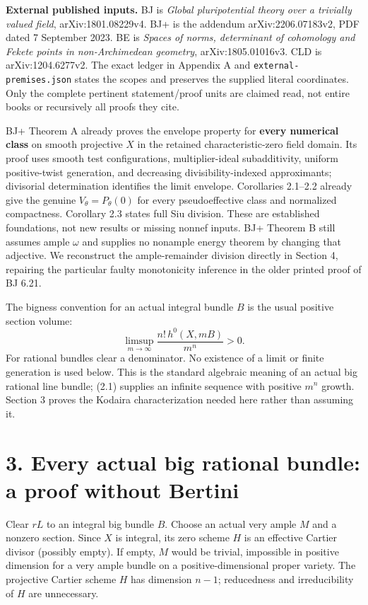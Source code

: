 \documentclass[
  10pt,
]{article}
\begin{document}
\textbf{External published inputs.} BJ is \emph{Global pluripotential
theory over a trivially valued field}, arXiv:1801.08229v4. BJ+ is the
addendum arXiv:2206.07183v2, PDF dated 7 September 2023. BE is
\emph{Spaces of norms, determinant of cohomology and Fekete points in
non-Archimedean geometry}, arXiv:1805.01016v3. CLD is arXiv:1204.6277v2.
The exact ledger in Appendix A and \texttt{external-premises.json}
states the scopes and preserves the supplied literal coordinates. Only
the complete pertinent statement/proof units are claimed read, not
entire books or recursively all proofs they cite.

BJ+ Theorem A already proves the envelope property for \textbf{every
numerical class} on smooth projective \(X\) in the retained
characteristic-zero field domain. Its proof uses smooth test
configurations, multiplier-ideal subadditivity, uniform positive-twist
generation, and decreasing divisibility-indexed approximants; divisorial
determination identifies the limit envelope. Corollaries 2.1--2.2
already give the genuine \(V_\theta=P_\theta(0)\) for every
pseudoeffective class and normalized compactness. Corollary 2.3 states
full Siu division. These are established foundations, not new results or
missing nonnef inputs. BJ+ Theorem B still assumes ample \(\omega\) and
supplies no nonample energy theorem by changing that adjective. We
reconstruct the ample-remainder division directly in Section 4,
repairing the particular faulty monotonicity inference in the older
printed proof of BJ 6.21.

The bigness convention for an actual integral bundle \(B\) is the usual
positive section volume: \[
 \limsup_{m\to\infty}\frac{n!\,h^0(X,mB)}{m^n}>0.              \tag{2.1}
\] For rational bundles clear a denominator. No existence of a limit or
finite generation is used below. This is the standard algebraic meaning
of an actual big rational line bundle; (2.1) supplies an infinite
sequence with positive \(m^n\) growth. Section 3 proves the Kodaira
characterization needed here rather than assuming it.

\section{3. Every actual big rational bundle: a proof without
Bertini}\label{every-actual-big-rational-bundle-a-proof-without-bertini}

Clear \(rL\) to an integral big bundle \(B\). Choose an actual very
ample \(M\) and a nonzero section. Since \(X\) is integral, its zero
scheme \(H\) is an effective Cartier divisor (possibly empty). If empty,
\(M\) would be trivial, impossible in positive dimension for a very
ample bundle on a positive-dimensional proper variety. The projective
Cartier scheme \(H\) has dimension \(n-1\); reducedness and
irreducibility of \(H\) are unnecessary.
\end{document}
